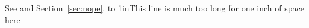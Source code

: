 \documentclass{article}
\begin{document}
See \cite{knuth84} and Section~\ref{sec:nope}.
\hbox to 1in{This line is much too long for one inch of space here}
\end{document}
